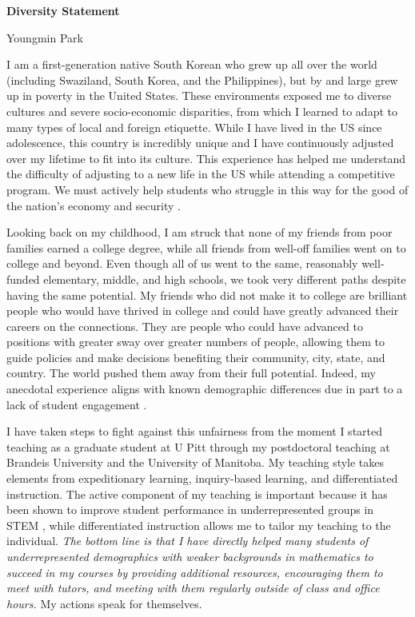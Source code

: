 \documentclass[a4paper,11pt]{article}
\begin{document}
	
	\begin{center}
		\Large \textbf{Diversity Statement}
		
		\Large Youngmin Park
	\end{center}
	
	I am a first-generation native South Korean who grew up all over the world (including Swaziland, South Korea, and the Philippines), but by and large grew up in poverty in the United States. These environments exposed me to diverse cultures and severe socio-economic disparities, from which I learned to adapt to many types of local and foreign etiquette. While I have lived in the US since adolescence, this country is incredibly unique and I have continuously adjusted over my lifetime to fit into its culture. This experience has helped me understand the difficulty of adjusting to a new life in the US while attending a competitive program. We must actively help students who struggle in this way for the good of the nation's economy and security \cite{jones2018call}.
	
	Looking back on my childhood, I am struck that none of my friends from poor families earned a college degree, while all friends from well-off families went on to college and beyond. Even though all of us went to the same, reasonably well-funded elementary, middle, and high schools, we took very different paths despite having the same potential. My friends who did not make it to college are brilliant people who would have thrived in college and could have greatly advanced their careers on the connections. They are people who could have advanced to positions with greater sway over greater numbers of people, allowing them to guide policies and make decisions benefiting their community, city, state, and country. The world pushed them away from their full potential. Indeed, my anecdotal experience aligns with known demographic differences \cite{jones2018call} due in part to a lack of student engagement \cite{kokkelenberg2010succeeds,savaria2017critical}.
	
	I have taken steps to fight against this unfairness from the moment I started teaching as a graduate student at U Pitt through my postdoctoral teaching at Brandeis University and the University of Manitoba. My teaching style takes elements from expeditionary learning, inquiry-based learning, and differentiated instruction. The active component of my teaching is important because it has been shown to improve student performance in underrepresented groups in STEM \cite{theobald2020active}, while differentiated instruction allows me to tailor my teaching to the individual. \textit{The bottom line is that I have directly helped many students of underrepresented demographics with weaker backgrounds in mathematics to succeed in my courses by providing additional resources, encouraging them to meet with tutors, and meeting with them regularly outside of class and office hours.} My actions speak for themselves.
	
\end{document}
